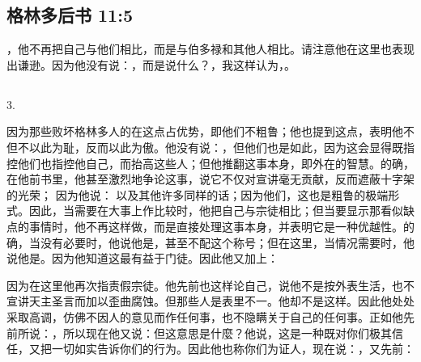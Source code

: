 
\subsection{格林多后书 11:5}

，他不再把自己与他们相比，而是与伯多禄和其他人相比。请注意他在这里也表现出谦逊。因为他没有说：，而是说什么？，我这样认为，。\par


\subsection{}

3. \par

因为那些败坏格林多人的在这点占优势，即他们不粗鲁；他也提到这点，表明他不但不以此为耻，反而以此为傲。他没有说：，但他们也是如此，因为这会显得既指控他们也指控他自己，而抬高这些人；但他推翻这事本身，即外在的智慧。的确，在他前书里，他甚至激烈地争论这事，说它不仅对宣讲毫无贡献，反而遮蔽十字架的光荣； 因为他说：  以及其他许多同样的话；因为他们，这也是粗鲁的极端形式。因此，当需要在大事上作比较时，他把自己与宗徒相比；但当要显示那看似缺点的事情时，他不再这样做，而是直接处理这事本身，并表明它是一种优越性。的确，当没有必要时，他说他是，甚至不配这个称号；但在这里，当情况需要时，他说他是。因为他知道这最有益于门徒。因此他又加上：\par

因为在这里他再次指责假宗徒。他先前也这样论自己，说他不是按外表生活，也不宣讲天主圣言而加以歪曲腐蚀。但那些人是表里不一。他却不是这样。因此他处处采取高调，仿佛不因人的意见而作任何事，也不隐瞒关于自己的任何事。正如他先前所说：，所以现在他又说：但这意思是什麼？他说，这是一种既对你们极其信任，又把一切如实告诉你们的行为。因此他也称你们为证人，现在说：，又先前： \par

